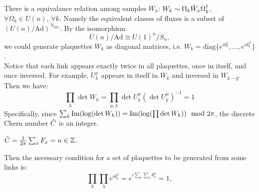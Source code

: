 There is a equivalance relation among samples $W_k$: $W_k \sim \Omega_k\Tilde{W}_x\Omega_k^\dagger$, $\forall \Omega_k\in U(n)$, $\forall k$. Namely the equivalent classes of fluxes is a subset of $(U(n)/\text{Ad})^{N_\text{site}}$.
By the isomorphism
\begin{equation}
    U(n)/\text{Ad}\cong U(1)^n/S_n,
\end{equation}
we could generate plaquettes $W_k$ as diagonal matrices, i.e. $W_k=\text{diag} \{e^{i\theta_k^1},\dots, e^{i\theta_k^N}\}$.\\
Notice that each link appears exactly twice in all plaquettes, once in itself, and once inversed. For example, $U_{k}^x$ appears in itself in $W_k$ and inversed in $W_{k-\hat{y}}$. Then we have:
$$\prod_k \det W_k = \prod_{\mu, k} \det U_k^\mu (\det U_k^\mu)^{-1}=1$$
Specifically, since $\sum_k\textrm{Im}(\log(\det W_k)) = \textrm{Im}(\log(\prod\det W_k)) \mod 2\pi$, the discrete Chern number $\Tilde{C}$ is an integer.
\begin{proposition}\label{chern}
    $\Tilde{C}=\frac{1}{2\pi}\sum_xF_x= n\in \mathbb{Z}$. 
\end{proposition}
Then the necessary condition for a set of plaquettes to be generated from some links is:
\begin{equation}\prod_{k}\prod_{\lambda} e^{i\theta_k^\lambda}=e^{i\sum_k\sum_\lambda \theta_k^\lambda}=1,\label{necessary}
\end{equation}


